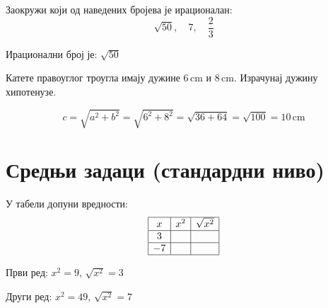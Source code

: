 \documentclass[11pt,a5paper,twoside,addpoints,answers]{exam} %
\newcommand{\measure}[2]{\mathrm{#1\,#2}}
\newcommand{\variant}[3]{#1}
\begin{document}
\begin{questions}
\begin{solution}[\stretch 1]
\begin{parts}
\end{parts}
\end{solution}
\ifprintanswers\newpage
\else
\fi

\question[2]
Заокружи који од наведених бројева је ирационалан:  
$$ \variant
{\sqrt{50},\quad 7,\quad \frac23}
{\sqrt{8},\quad -5,\quad 1,\!25}
{\sqrt{3},\quad -2,\quad \frac{5}{4}}
$$
\begin{solution}[\stretch 1]
Ирационални број је:
\variant{$\sqrt{50}$}{$\sqrt{8}$}{$\sqrt{3}$}
\end{solution}

\question[3]
Катете правоуглог троугла имају дужине $\measure{\variant{6}{8}{5}}{cm}$ и $\measure{\variant{8}{15}{12}}{cm}$. Израчунај дужину хипотенузе.
\begin{solution}[\stretch 3]
$$
c = \sqrt{a^2 + b^2} = \sqrt{\variant{6}{8}{5}^2 + \variant{8}{15}{12}^2} = \sqrt{\variant{36+64}{64+225}{25+144}} = \sqrt{\variant{100}{289}{169}} = \measure{\variant{10}{17}{13}}{cm}
$$
\end{solution}
\ifprintanswers
\else\answerline\newpage
\fi

\section{Средњи задаци (стандардни ниво)}

\question[4]
У табели допуни вредности:
$$
\begin{array}{|c|c|c|} \hline
x & x^2 & \sqrt{x^2} \\ \hline
\variant{3}{-4}{\frac{5}{2}} & & \\ \hline
\variant{-7}{\frac{3}{4}}{-1,\!2} & & \\ \hline
\end{array}
$$
\begin{solution}[\stretch 1]
Први ред:
\quad $x^2 = \variant{9}{16}{\frac{25}{4}}$,
\quad $\sqrt{x^2} = \variant{3}{4}{\frac{5}{2}}$

Други ред:
\quad $x^2 = \variant{49}{\frac{9}{16}}{1,\!44}$,
\quad $\sqrt{x^2} = \variant{7}{\frac{3}{4}}{1,\!2}$
\end{solution}
\ifprintanswers\newpage
\else
\fi


\end{questions}
\end{document}
